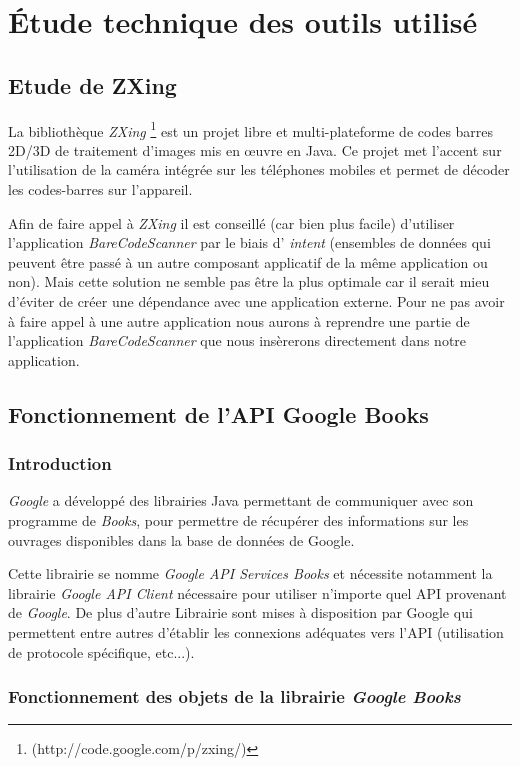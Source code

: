 \section{Étude technique des outils utilisé}

\subsection{Etude de ZXing}
La bibliothèque \emph{ZXing} \footnote{(http://code.google.com/p/zxing/)} est un projet libre et multi-plateforme de codes barres 2D/3D de traitement d'images mis en œuvre en Java. Ce projet met l'accent sur l'utilisation de la caméra intégrée sur les téléphones mobiles et permet de décoder les codes-barres sur l'appareil.

Afin de faire appel à \emph{ZXing} il est conseillé (car bien plus facile) 
	d'utiliser l'application \emph{BareCodeScanner} par le biais d' \emph{intent} (ensembles de données qui peuvent être passé à un autre composant applicatif de la même application ou non). 
Mais cette solution ne semble pas être la plus optimale car il serait mieu d'éviter de créer une dépendance avec une application externe.
Pour ne pas avoir à faire appel à une autre application nous aurons à reprendre une partie de l'application \emph{BareCodeScanner} que nous insèrerons directement dans notre application. 

\subsection{Fonctionnement de l'API Google Books}

\subsubsection{Introduction}

\emph{Google} a développé des librairies Java permettant de communiquer avec son programme de \emph{Books}, pour permettre de récupérer des informations sur les ouvrages disponibles dans la base de données de Google.

Cette librairie se nomme  \emph{Google API Services Books} et nécessite notamment la librairie \emph{Google API Client} nécessaire pour utiliser n'importe quel API provenant de \emph{Google}. 
De plus d'autre Librairie sont mises à disposition par Google qui permettent entre autres d'établir les connexions adéquates vers l'API (utilisation de protocole spécifique, etc...).

\subsubsection{Fonctionnement des objets de la librairie \emph{Google Books}}

